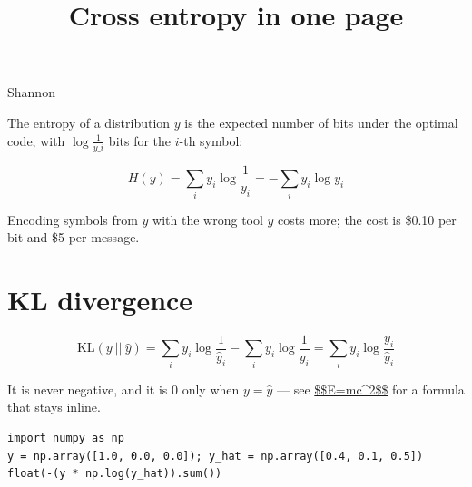 \documentclass[11pt,a4paper]{article}
\title{Cross entropy in one page}
\begin{document}
\maketitle

\begin{figure}[h]
\end{figure}

Shannon

The entropy of a distribution $y$ is the expected number of bits under the optimal code, with $\log \frac{1}{y\_i}$ bits for the $i$-th symbol:

$$H(y) = \sum_i y_i \log \frac{1}{y_i} = -\sum_i y_i \log y_i$$

Encoding symbols from $y$ with the wrong tool $\hat{y}$ costs more; the cost is \$0.10 per bit and \$5 per message.

\section{KL divergence}

$$\mbox{KL}(y~||~\hat{y})
= \sum_i y_i \log \frac{1}{\hat{y}_i} - \sum_i y_i \log \frac{1}{y_i}
= \sum_i y_i \log \frac{y_i}{\hat{y}_i}$$

It is never negative, and it is 0 only when $y = \hat{y}$ — see \href{https://en.wikipedia.org/wiki/Mass\%E2\%80\%93energy\_equivalence}{\$\$E=mc\textasciicircum{}2\$\$} for a formula that stays inline.

\begin{verbatim}
import numpy as np
y = np.array([1.0, 0.0, 0.0]); y_hat = np.array([0.4, 0.1, 0.5])
float(-(y * np.log(y_hat)).sum())
\end{verbatim}
\end{document}
